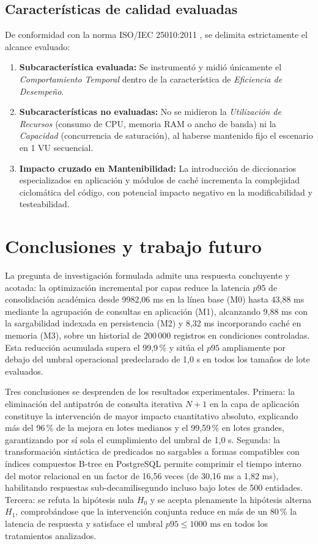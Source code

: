 \documentclass[conference]{IEEEtran}
\begin{document}
\subsection{Características de calidad evaluadas}
De conformidad con la norma ISO/IEC 25010:2011 \cite{ISO25010}, se delimita estrictamente el alcance evaluado:
\begin{enumerate}
    \setlength{\itemsep}{1pt}
    \setlength{\parskip}{0pt}
    \item \textbf{Subcaracterística evaluada:} Se instrumentó y midió únicamente el \textit{Comportamiento Temporal} dentro de la característica de \textit{Eficiencia de Desempeño}.
    \item \textbf{Subcaracterísticas no evaluadas:} No se midieron la \textit{Utilización de Recursos} (consumo de CPU, memoria RAM o ancho de banda) ni la \textit{Capacidad} (concurrencia de saturación), al haberse mantenido fijo el escenario en 1 VU secuencial.
    \item \textbf{Impacto cruzado en Mantenibilidad:} La introducción de diccionarios especializados en aplicación y módulos de caché incrementa la complejidad ciclomática del código, con potencial impacto negativo en la modificabilidad y testeabilidad.
\end{enumerate}

\section{Conclusiones y trabajo futuro}

La pregunta de investigación formulada admite una respuesta concluyente y acotada: la optimización incremental por capas reduce la latencia $p95$ de consolidación académica desde 9982,06 ms en la línea base (M0) hasta 43,88 ms mediante la agrupación de consultas en aplicación (M1), alcanzando 9,88 ms con la sargabilidad indexada en persistencia (M2) y 8,32 ms incorporando caché en memoria (M3), sobre un historial de 200\,000 registros en condiciones controladas. Esta reducción acumulada supera el 99,9\,\% y sitúa el $p95$ ampliamente por debajo del umbral operacional predeclarado de 1,0 s en todos los tamaños de lote evaluados.

Tres conclusiones se desprenden de los resultados experimentales. Primera: la eliminación del antipatrón de consulta iterativa $N+1$ en la capa de aplicación constituye la intervención de mayor impacto cuantitativo absoluto, explicando más del 96\,\% de la mejora en lotes medianos y el 99,59\,\% en lotes grandes, garantizando por sí sola el cumplimiento del umbral de 1,0 s. Segunda: la transformación sintáctica de predicados no sargables a formas compatibles con índices compuestos B-tree en PostgreSQL permite comprimir el tiempo interno del motor relacional en un factor de 16,56 veces (de 30,16 ms a 1,82 ms), habilitando respuestas sub-decamilisegundo incluso bajo lotes de 500 entidades. Tercera: se refuta la hipótesis nula $H_0$ y se acepta plenamente la hipótesis alterna $H_1$, comprobándose que la intervención conjunta reduce en más de un 80\,\% la latencia de respuesta y satisface el umbral $p95 \le 1000\text{ ms}$ en todos los tratamientos analizados.
\end{document}
